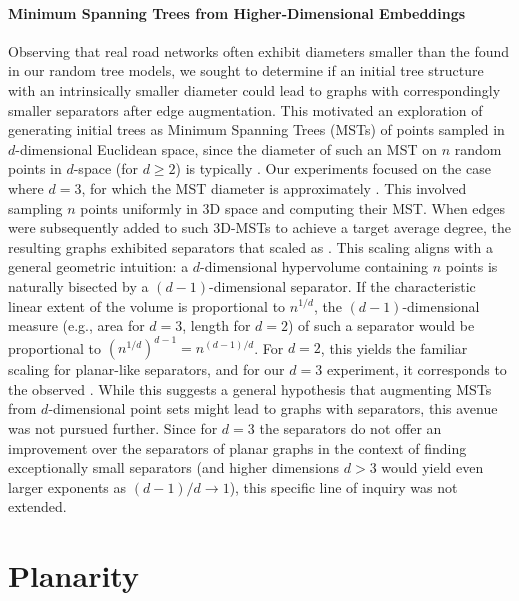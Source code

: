 \paragraph{Minimum Spanning Trees from Higher-Dimensional Embeddings}
\label{sec:synthetic:mst}
Observing that real road networks often exhibit diameters smaller than the  found in our random tree models, we sought to determine if an initial tree structure with an intrinsically smaller diameter could lead to graphs with correspondingly smaller separators after edge augmentation.
This motivated an exploration of generating initial trees as Minimum Spanning Trees (MSTs) of points sampled in \(d\)-dimensional Euclidean space, since the diameter of such an MST on \(n\) random points in \(d\)-space (for \(d \ge 2\)) is typically .
Our experiments focused on the case where \(d=3\), for which the MST diameter is approximately .
This involved sampling \(n\) points uniformly in 3D space and computing their MST.
When edges were subsequently added to such 3D-MSTs to achieve a target average degree, the resulting graphs exhibited separators that scaled as .
This scaling aligns with a general geometric intuition: a \(d\)-dimensional hypervolume containing \(n\) points is naturally bisected by a \((d-1)\)-dimensional separator.
If the characteristic linear extent of the volume is proportional to \(n^{1/d}\), the \((d-1)\)-dimensional measure (e.g., area for \(d=3\), length for \(d=2\)) of such a separator would be proportional to \((n^{1/d})^{d-1} = n^{(d-1)/d}\).
For \(d=2\), this yields the familiar  scaling for planar-like separators, and for our \(d=3\) experiment, it corresponds to the observed .
While this suggests a general hypothesis that augmenting MSTs from \(d\)-dimensional point sets might lead to graphs with  separators, this avenue was not pursued further.
Since for \(d=3\) the  separators do not offer an improvement over the  separators of planar graphs in the context of finding exceptionally small separators (and higher dimensions \(d > 3\) would yield even larger exponents as \((d-1)/d \to 1\)), this specific line of inquiry was not extended.






\section{Planarity}
\label{sec:synthetic:planarity}

